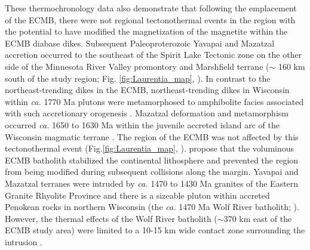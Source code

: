 \documentclass[draft]{agujournal2019}
\begin{document}
These thermochronology data also demonstrate that following the emplacement of the ECMB, there were not regional tectonothermal events in the region with the potential to have modified the magnetization of the magnetite within the ECMB diabase dikes. Subsequent Paleoproterozoic Yavapai and Mazatzal accretion occurred to the southeast of the Spirit Lake Tectonic zone on the other side of the Minnesota River Valley promontory and Marshfield terrane ($\sim$ 160 km south of the study region; Fig. \ref{fig:Laurentia_map}, ). In contrast to the northeast-trending dikes in the ECMB, northeast-trending dikes in Wisconsin within \textit{ca.} 1770 Ma plutons were metamorphosed to amphibolite facies associated with such accretionary orogenesis \cite{Holm1998b}. Mazatzal deformation and metamorphism occurred \textit{ca.} 1650 to 1630 Ma within the juvenile accreted island arc of the Wisconsin magmatic terrane \cite{Holm1998c}. The region of the ECMB was not affected by this tectonothermal event (Fig.\ref{fig:Laurentia_map}, ).  propose that the voluminous ECMB batholith stabilized the continental lithosphere and prevented the region from being modified during subsequent collisions along the margin. Yavapai and Mazatzal terranes were intruded by \textit{ca.} 1470 to 1430 Ma granites of the Eastern Granite Rhyolite Province and there is a sizeable pluton within accreted Penokean rocks in northern Wisconsin (the \textit{ca.} 1470 Ma Wolf River batholith; \cite{Dewane2007a}). However, the thermal effects of the Wolf River batholith ($\sim$370 km east of the ECMB study area) were limited to a 10-15 km wide contact zone surrounding the intrusion \cite{Holm2019a}. 
\end{document}
